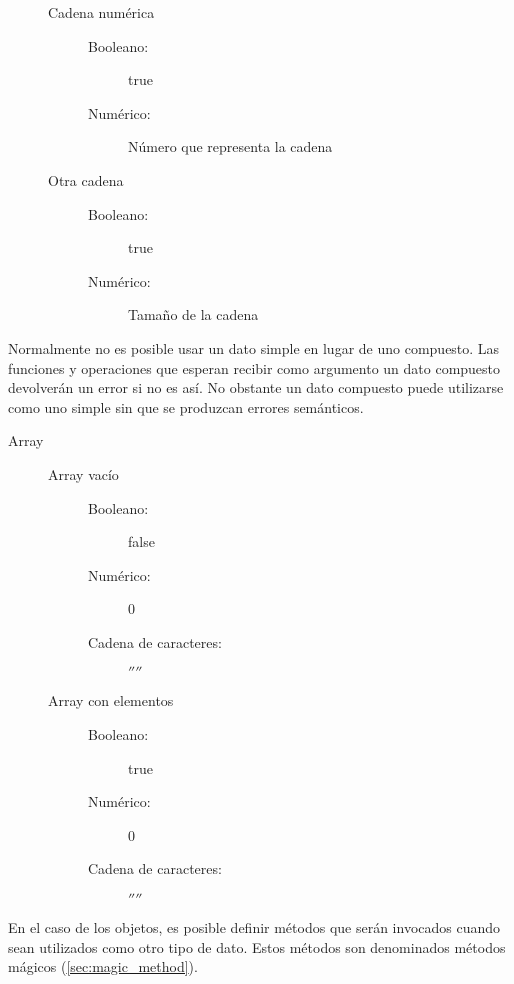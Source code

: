 \begin{description}
\begin{description}
\begin{description}
      \end{description}
   \item[Cadena numérica] \hfill
      \begin{description}
      \item[Booleano:] true 
      \item[Numérico:] Número que representa la cadena
      \end{description}
   \item[Otra cadena] \hfill
      \begin{description}
      \item[Booleano:] true 
      \item[Numérico:] Tamaño de la cadena
      \end{description}
   \end{description}
\end{description}

Normalmente no es posible usar un dato simple en lugar de uno compuesto. Las funciones y operaciones que esperan recibir como argumento
un dato compuesto devolverán un error si no es así. No obstante un dato compuesto puede utilizarse como uno simple sin que se produzcan
errores semánticos.
\pagebreak

\begin{description}
\item[Array] \hfill
   \begin{description}
   \item[Array vacío] \hfill
      \begin{description}
      \item[Booleano:] false 
      \item[Numérico:] 0
      \item[Cadena de caracteres:] $''$$''$
      \end{description}
   \item[Array con elementos] \hfill
      \begin{description}
      \item[Booleano:] true 
      \item[Numérico:] 0   
      \item[Cadena de caracteres:] $''$$''$
      \end{description}
   \end{description}
\end{description}

En el caso de los objetos, es posible definir métodos que serán invocados cuando sean utilizados como otro tipo de dato. Estos métodos son denominados 
métodos mágicos (\autoref{sec:magic_method}).

